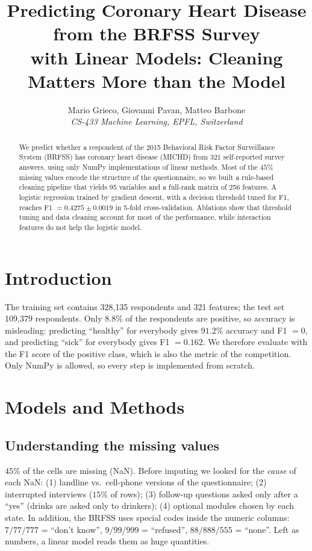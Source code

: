 \documentclass[10pt,conference,compsocconf]{IEEEtran}
\begin{document}
\title{Predicting Coronary Heart Disease from the BRFSS Survey\\with Linear Models: Cleaning Matters More than the Model}

\author{
  Mario Grieco, Giovanni Pavan, Matteo Barbone\\
  \textit{CS-433 Machine Learning, EPFL, Switzerland}
}

\maketitle

\begin{abstract}
We predict whether a respondent of the 2015 Behavioral Risk Factor Surveillance System (BRFSS) has coronary heart disease (MICHD) from 321 self-reported survey answers, using only NumPy implementations of linear methods. Most of the $45\%$ missing values encode the structure of the questionnaire, so we built a rule-based cleaning pipeline that yields 95 variables and a full-rank matrix of 256 features. A logistic regression trained by gradient descent, with a decision threshold tuned for F1, reaches F1 $=0.4275\pm0.0019$ in 5-fold cross-validation. Ablations show that threshold tuning and data cleaning account for most of the performance, while interaction features do not help the logistic model.
\end{abstract}

\section{Introduction}
The training set contains 328{,}135 respondents and 321 features; the test set 109{,}379 respondents. Only $8.8\%$ of the respondents are positive, so accuracy is misleading: predicting ``healthy'' for everybody gives $91.2\%$ accuracy and F1 $=0$, and predicting ``sick'' for everybody gives F1 $=0.162$. We therefore evaluate with the F1 score of the positive class, which is also the metric of the competition. Only NumPy is allowed, so every step is implemented from scratch.

\section{Models and Methods}

\subsection{Understanding the missing values}
$45\%$ of the cells are missing (NaN). Before imputing we looked for the \emph{cause} of each NaN: (1) landline vs.\ cell-phone versions of the questionnaire; (2) interrupted interviews ($15\%$ of rows); (3) follow-up questions asked only after a ``yes'' (drinks are asked only to drinkers); (4) optional modules chosen by each state. In addition, the BRFSS uses special codes inside the numeric columns: $7/77/777$ = ``don't know'', $9/99/999$ = ``refused'', $88/888/555$ = ``none''. Left as numbers, a linear model reads them as huge quantities.
\end{document}
